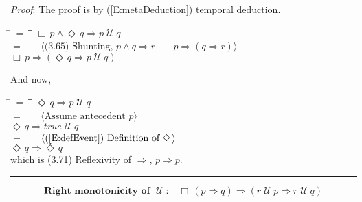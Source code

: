 \documentclass[12pt, fleqn, leqno]{article}
\newcommand{\lgap}{2pt}                             %
\newcommand{\mymathindent}{24pt}                    %
\newcommand{\equivs}{\ensuremath{\;\equiv\;}}       %
\newcommand{\impl}{\ensuremath{\Rightarrow}}        %
\newcommand{\Until}{\;\mathcal{U}\;}
\newcommand{\Event}{\Diamond\,}
\newcommand{\Always}{\Box\,}
\newcommand{\myqed}{\rule[-.23ex]{1.2ex}{2.0ex}}
\newcommand{\myqedtab}{\hspace{384pt}}              %
\newcommand{\Gll} {\langle}                         %
\newcommand{\Ggg} {\rangle}                         %
\newcommand{\Hint}[1]     {\ \ \ $\Gll              \mbox{#1} \Ggg$ }   %
\begin{document}
\emph{Proof}: The proof is by (\ref{E:metaDeduction}) temporal deduction.
\begin{tabbing}
\hspace{\mymathindent} \= $= \;$ \= \myqedtab \= \kill
  \> \>   $\Always p \land \Event q \impl p \Until q$\\[\lgap]
  \> $=$  \>  \Hint{(3.65) Shunting, $p\land q\impl r\equivs p\impl (q\impl r)$}\\[\lgap]
  \> \>   $\Always p \impl (\Event q  \impl p \Until q)$
\end{tabbing}
And now,
\begin{tabbing}
\hspace{\mymathindent} \= $= \;$ \= \myqedtab \= \kill
  \> \>   $\Event q  \impl p \Until q$\\[\lgap]
  \> $=$  \>  \Hint{Assume antecedent $p$}\\[\lgap]
  \> \>   $\Event q  \impl true \Until q$\\[\lgap]
 \> $=$  \>  \Hint{(\ref{E:defEvent}) Definition of $\Event$}\\[\lgap]
  \> \>   $\Event q  \impl  \Event q$\\[\lgap]
    \> which is (3.71) Reflexivity of $\impl$, $p\impl p$. \quad \myqed
\end{tabbing}
\begin{equation}\label{E:rightMonoUntil}
\textbf{Right monotonicity of $\Until$:}\quad \Always (p \impl q) \impl (r \Until p \impl r \Until q)
\end{equation}
\end{document}
